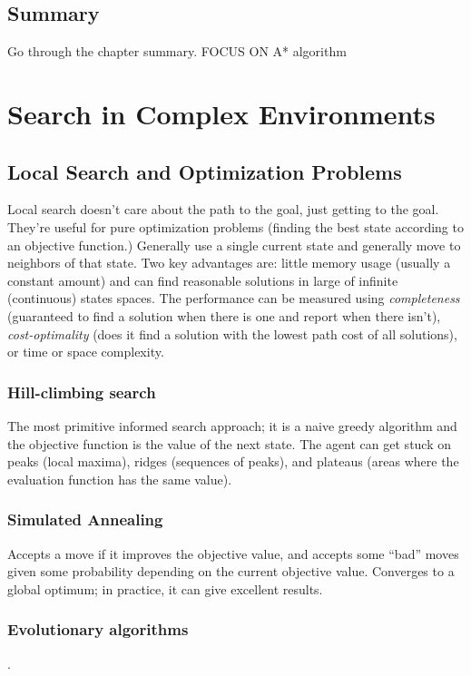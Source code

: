\documentclass[exam={Midterm},color=true]{cs581exam}
\begin{document}
\subsection{Summary}\label{subsec:3-summary}
Go through the chapter summary. FOCUS ON A* algorithm

\section{Search in Complex Environments}\label{sec:search-in-complex-environments}
\subsection{Local Search and Optimization Problems}\label{subsec:local-search-and-optimization-problems}
Local search doesn't care about the path to the goal, just getting to the goal.
They're useful for pure optimization problems (finding the best state according to an objective function.)
Generally use a single current state and generally move to neighbors of that state.
Two key advantages are: little memory usage (usually a constant amount) and can find reasonable solutions in large of infinite (continuous) states spaces.
The performance can be measured using \emph{completeness} (guaranteed to find a solution when there is one and report when there isn't), \emph{cost-optimality} (does it find a solution with the lowest path cost of all solutions), or time or space complexity.
%
\subsubsection{Hill-climbing search}\label{subsubsec:4.1.1}
The most primitive informed search approach; it is a naive greedy algorithm and the objective function is the value of the next state.
The agent can get stuck on peaks (local maxima), ridges (sequences of peaks), and plateaus (areas where the evaluation function has the same value).

\subsubsection{Simulated Annealing}\label{subsubsec:4.1.2}
Accepts a move if it improves the objective value, and accepts some ``bad'' moves given some probability depending on the current objective value.
Converges to a global optimum; in practice, it can give excellent results.

\setcounter{subsection}{3}%
\subsubsection{Evolutionary algorithms}\label{subsubsec:4.1.4}
.
\end{document}
